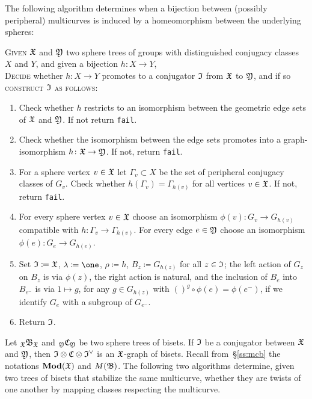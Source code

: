 \documentclass{amsart}
\begin{document}
The following algorithm determines when a bijection between (possibly
peripheral) multicurves is induced by a homeomorphism between the
underlying spheres:
\begin{algo}\label{algo:MarkCl:Prom}
  \textsc{Given} ${\mathfrak X}$ and ${\mathfrak Y}$ two sphere trees of groups
  with distinguished conjugacy classes $X$ and $Y$, and given a
  bijection $h\colon X\to Y$,\\
  \textsc{Decide} whether $h\colon X\to Y$ promotes to a conjugator
  ${\mathfrak I}$ from ${\mathfrak X}$ to ${\mathfrak Y}$, and if so
  \textsc{construct} ${\mathfrak I}$ \textsc{as follows:}\\\upshape
  \begin{enumerate}
  \item Check whether $h$ restricts to an isomorphism between the geometric
    edge sets of ${\mathfrak X}$ and ${\mathfrak Y}$. If not return \texttt{fail}.
  \item Check whether the isomorphism between the edge sets promotes
    into a graph-isomorphism $h\colon{\mathfrak X}\to{\mathfrak Y}$. If
    not, return \texttt{fail}.
  \item For a sphere vertex $v\in {\mathfrak X}$ let $\Gamma_v\subset X$ be the set
    of peripheral conjugacy classes of $G_v$. Check whether
    $h(\Gamma_v)=\Gamma_{h(v)}$ for all vertices $v\in {\mathfrak X}$. If
    not, return \texttt{fail}.
  \item For every sphere vertex $v\in{\mathfrak X}$ choose an isomorphism
    $\phi(v)\colon G_v\to G_{h(v)}$ compatible with $h\colon \Gamma_v\to
    \Gamma_{h(v)}$. For every edge $e\in {\mathfrak Y}$ choose an isomorphism
    $\phi(e)\colon G_e\to G_{h(e)}$.
  \item Set ${\mathfrak I}\coloneqq {\mathfrak X}$, $\lambda\coloneqq\one$,
    $\rho \coloneqq h$, $B_z\coloneqq G_{h(z)}$ for all $z\in {\mathfrak I}$;
    the left action of $G_z$ on $B_z$ is via $\phi(z)$, the right
    action is natural, and the inclusion of $B_e$ into $B_{e^-}$ is
    via $1\mapsto g$, for any $g\in G_{h(z)}$ with
    $()^g\circ\phi(e)=\phi(e^-)$, if we identify $G_e$ with a subgroup
    of $G_{e^-}$.
  \item Return ${\mathfrak I}$.
  \end{enumerate}
\end{algo}

Let $\subscript\gf\gfB_\gf$ and $\subscript\gfY\gfC_\gfY$ be two
sphere trees of bisets. If ${\mathfrak I}$ be a conjugator between ${\mathfrak X}$ and
${\mathfrak Y}$, then ${\mathfrak I} \otimes {\mathfrak C} \otimes {\mathfrak I}^{\vee}$ is an ${\mathfrak X}$-graph
of bisets. Recall from~\S\ref{ss:mcb} the notations $\mathbf{\relax Mod}({\mathfrak X})$ and
$M({\mathfrak B})$.  The following two algorithms determine, given two trees of
bisets that stabilize the same multicurve, whether they are twists of
one another by mapping classes respecting the multicurve.
\end{document}
